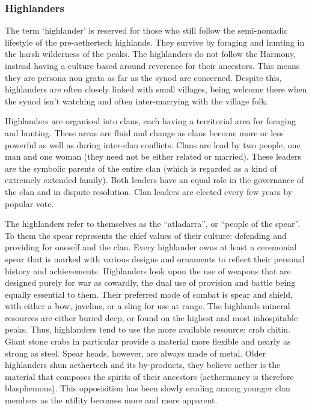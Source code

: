 \documentclass[a4paper,11pt,oneside]{book}
\begin{document}
\subsubsection{Highlanders}
The term `highlander' is reserved for those who still follow the semi-nomadic lifestyle of the pre-aethertech highlands. They survive by foraging and hunting in the harsh wilderness of the peaks. The highlanders do not follow the Harmony, instead having a culture based around reverence for their ancestors. This means they are persona non grata as far as the synod are concerned. Despite this, highlanders are often closely linked with small villages, being welcome there when the synod isn't watching and often inter-marrying with the village folk.   

Highlanders are organised into clans, each having a territorial area for foraging and hunting. These areas are fluid and change as clans become more or less powerful as well as during inter-clan conflicts. Clans are lead by two people, one man and one woman (they need not be either related or married). These leaders are the symbolic parents of the entire clan (which is regarded as a kind of extremely extended family). Both leaders have an equal role in the governance of the clan and in dispute resolution. Clan leaders are elected every few years by popular vote.  

The highlanders refer to themselves as the ``atladarra'', or ``people of the spear''. To them the spear represents the chief values of their culture: defending and providing for oneself and the clan. Every highlander owns at least a ceremonial spear that is marked with various designs and ornaments to reflect their personal history and achievements. Highlanders look upon the use of weapons that are designed purely for war as cowardly, the dual use of provision and battle being equally essential to them. Their preferred mode of combat is spear and shield, with either a bow, javelins, or a sling for use at range. The highlands mineral resources are either buried deep, or found on the highest and most inhospitable peaks. Thus, highlanders tend to use the more available resource: crab chitin. Giant stone crabs in particular provide a material more flexible and nearly as strong as steel. Spear heads, however, are always made of metal. Older highlanders shun aethertech and its by-products, they believe aether is the material that composes the spirits of their ancestors (aethermancy is therefore blasphemous). This opposisition has been slowly eroding among younger clan members as the utility becomes more and more apparent.  
\end{document}
